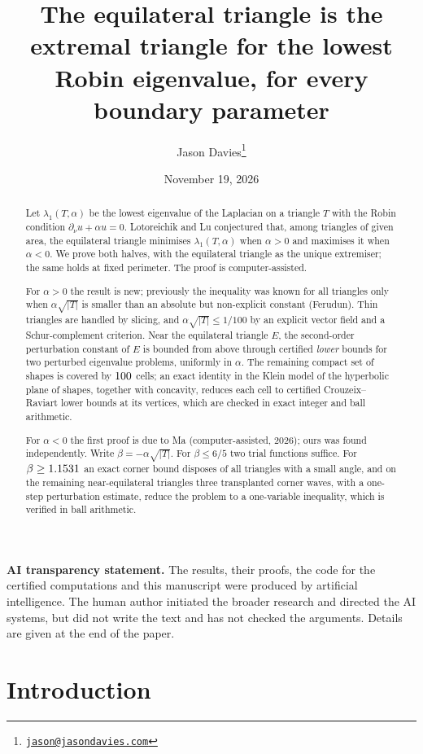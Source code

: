 \documentclass[11pt]{article}
\title{The equilateral triangle is the extremal triangle for the lowest Robin eigenvalue, for every
boundary parameter}
\author{Jason Davies\thanks{\href{mailto:jason@jasondavies.com}{\nolinkurl{jason@jasondavies.com}}}}
\date{November 19, 2026}
\theoremstyle{remark}
\begin{document}
\maketitle
\begin{abstract}
Let $\lambda_1(T,\alpha)$ be the lowest eigenvalue of the Laplacian on a triangle $T$ with the Robin
condition $\partial_\nu u+\alpha u=0$. Lotoreichik and Lu conjectured that, among triangles of given
area, the equilateral triangle minimises $\lambda_1(T,\alpha)$ when $\alpha>0$ and maximises it when
$\alpha<0$. We prove both halves, with the equilateral triangle as the unique extremiser; the same holds
at fixed perimeter. The proof is computer-assisted.

For $\alpha>0$ the result is new; previously the inequality was known for all triangles only when
$\alpha\sqrt{|T|}$ is smaller than an absolute but non-explicit constant (Ferudun). Thin triangles are
handled by slicing, and $\alpha\sqrt{|T|}\le1/100$ by an explicit vector field and a Schur-complement
criterion. Near the equilateral triangle $E$, the second-order perturbation constant of $E$ is bounded
from above through certified \emph{lower} bounds for two perturbed eigenvalue problems, uniformly in
$\alpha$. The remaining compact set of shapes is covered by $100$ cells; an exact identity in the
Klein model of the hyperbolic plane of shapes, together with concavity, reduces each cell to certified
Crouzeix--Raviart lower bounds at its vertices, which are checked in exact integer and ball arithmetic.

For $\alpha<0$ the first proof is due to Ma (computer-assisted, 2026); ours was found independently.
Write $\beta=-\alpha\sqrt{|T|}$. For $\beta\le6/5$ two trial functions suffice. For
$\beta\ge1.1531$ an exact corner bound disposes of all triangles with a small angle, and on the
remaining near-equilateral triangles three transplanted corner waves, with a one-step perturbation
estimate, reduce the problem to a one-variable inequality, which is verified in ball arithmetic.
\end{abstract}

\noindent\textbf{AI transparency statement.} The results, their proofs, the code for the certified
computations and this manuscript were produced by artificial intelligence. The human author initiated
the broader research and directed the AI systems, but did not write the text and has not checked the
arguments. Details are given at the end of the paper.

\section{Introduction}\label{sec:intro}
\end{document}
